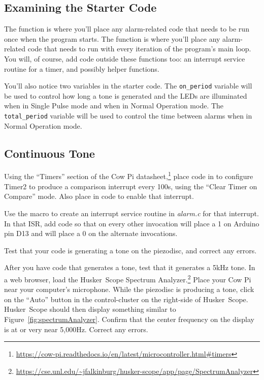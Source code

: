 \subsection{Examining the Starter Code}

The  function is where you'll place any alarm-related code that needs to be run once when the program starts.
The  function is where you'll place any alarm-related code that needs to run with every iteration of the program's main loop.
You will, of course, add code outside these functions too: an interrupt service routine for a timer, and possibly helper functions.

You'll also notice two variables in the starter code.
The \lstinline{on_period} variable will be used to control how long a tone is generated and the LEDs are illuminated when in Single Pulse mode and when in Normal Operation mode.
The \lstinline{total_period} variable will be used to control the time between alarms when in Normal Operation mode.

\subsection{Continuous Tone}

Using the ``Timers'' section of the Cow Pi datasheet,\footnote{
    \url{https://cow-pi.readthedocs.io/en/latest/microcontroller.html\#timers}
}
place code in  to configure Timer2 to produce a comparison interrupt every 100\textmu s, using the ``Clear Timer on Compare'' mode.
Also place in  code to enable that interrupt.

Use the  macro to create an interrupt service routine in \textit{alarm.c} for that interrupt.
In that ISR, add code so that on every other invocation will place a 1 on Arduino pin D13 and will place a 0 on the alternate invocations.

Test that your code is generating a tone on the piezodisc, and correct any errors.

After you have code that generates a tone, test that it generates a 5kHz tone.
In a web browser, load the Husker~Scope Spectrum Analyzer.\footnote{
    \url{https://cse.unl.edu/~jfalkinburg/husker-scope/app/page/SpectrumAnalyzer}
}
Place your Cow Pi near your computer's microphone.
While the piezodisc is producing a tone, click on the ``Auto'' button in the control-cluster on the right-side of Husker~Scope.
Husker~Scope should then display something similar to Figure~\ref{fig:spectrumAnalyzer}.
Confirm that the center frequency on the display is at or very near 5,000Hz.
Correct any errors.

